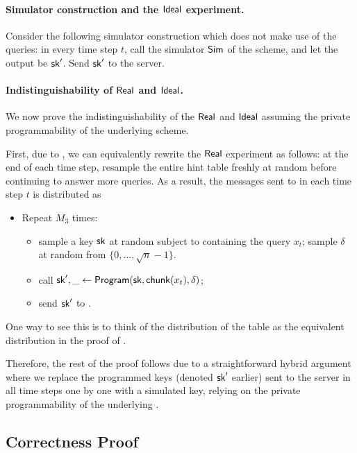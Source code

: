 \paragraph{Simulator construction and the ${\sf Ideal}$ experiment.}
Consider the following simulator construction which does not make
use of the queries: 
in every time step $t$, call the simulator $\mathsf{Sim}$ of the \ppps
scheme, and let the output be $\mathsf{sk}'$. 
Send $\mathsf{sk}'$ to the server. 

\paragraph{Indistinguishability of ${\sf Real}$ and 
${\sf Ideal}$.}
We now prove the indistinguishability of the ${\sf Real}$ and
${\sf Ideal}$
assuming the 
private programmability of the underlying \ppps scheme.

First, due to , 
we can equivalently rewrite the ${\sf Real}$ experiment as follows:
at the end of each time step, resample the entire hint table
freshly at random before continuing to answer more queries.
As a result, the %
messages sent to 
\algA in each time step $t$
is distributed as 
\begin{itemize}[leftmargin=5mm]
\item[]
Repeat $M_3$ times: 
\begin{itemize}[leftmargin=5mm]
\item 
sample a \ppps key $\mathsf{sk}$
 at random subject to containing the query $x_t$;
sample $\delta$ at random
from $\{0, \ldots, \sqrt{n}-1\}$.
\item 
call $\mathsf{sk}', \_ \leftarrow {\sf Program}(\mathsf{sk}, \mathsf{chunk}(x_t), \delta)$; 
\item 
send $\mathsf{sk}'$ to \algA.
\end{itemize}
\end{itemize}
One way to see this is to think of the distribution of the table
as the equivalent distribution
in the proof of .

Therefore, the rest of the proof follows
due to a straightforward hybrid argument
where we replace
the programmed keys (denoted $\mathsf{sk}'$ earlier) 
sent to the server in all time steps one by one
with a simulated key, 
relying on the private programmability of the underlying \ppps.

\subsection{Correctness Proof}
\label{sec:1server-correct}


